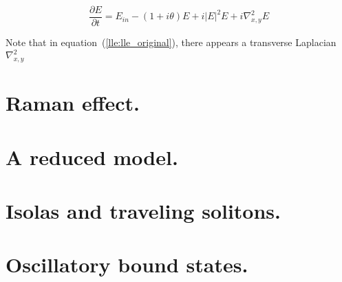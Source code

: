 \begin{equation}
    \dfrac{\partial E}{\partial t} = E_{in} - (1 + i\theta) E + i |E|^2 E + i\nabla^2_{x,y} E
    \label{lle:lle_original}
\end{equation}

Note that in equation~(\ref{lle:lle_original}), there appears a transverse Laplacian $\nabla^2_{x,y}$

\section{Raman effect.}

\section{A reduced model.}

\section{Isolas and traveling solitons.}

\section{Oscillatory bound states.}
